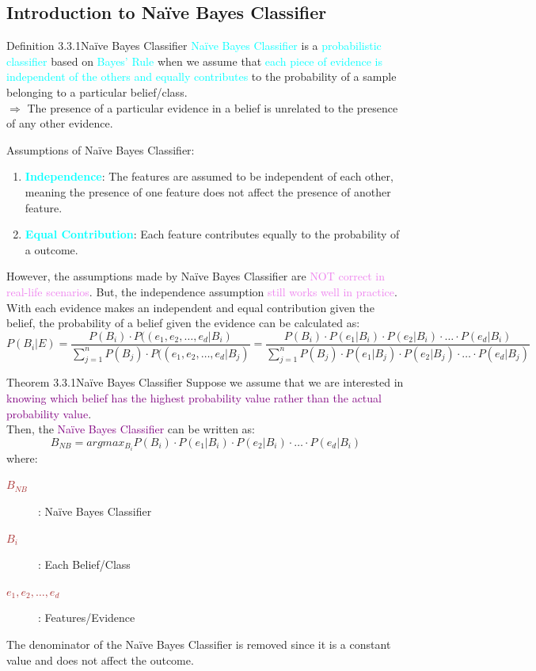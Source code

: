 \documentclass{book}
\begin{document}
\subsection{Introduction to Naïve Bayes Classifier}
\begin{defBox}{Definition 3.3.1}{Naïve Bayes Classifier}
    \textcolor{cyan}{Naïve Bayes Classifier} is a \textcolor{cyan}{probabilistic classifier} based on \textcolor{cyan}{Bayes' Rule} when we assume that \textcolor{cyan}{each piece of evidence is independent of the others and equally contributes} to the probability of a sample belonging to a particular belief/class. \\
    $\Rightarrow$ The presence of a particular evidence in a belief is unrelated to the presence of any other evidence.
\end{defBox}
Assumptions of Naïve Bayes Classifier:
\begin{enumerate}
    \item \textcolor{cyan}{\textbf{Independence}}: The features are assumed to be independent of each other, meaning the presence of one feature does not affect the presence of another feature.
    \item \textcolor{cyan}{\textbf{Equal Contribution}}: Each feature contributes equally to the probability of a outcome.
\end{enumerate}
However, the assumptions made by Naïve Bayes Classifier are \textcolor{violet}{NOT correct in real-life scenarios}. But, the independence assumption \textcolor{violet}{still works well in practice}.\\
\vspace{1mm}
With each evidence makes an independent and equal contribution given the belief, the probability of a belief given the evidence can be calculated as:
\[
    P(B_i|E) = \frac{P(B_i) \cdot P((e_1, e_2, \ldots, e_d|B_i)}{\sum_{j=1}^{n} P(B_j) \cdot P((e_1, e_2, \ldots, e_d|B_j)} = \frac{P(B_i) \cdot P(e_1|B_i) \cdot P(e_2|B_i) \cdot \ldots \cdot P(e_d|B_i)}{\sum_{j=1}^{n} P(B_j) \cdot P(e_1|B_j) \cdot P(e_2|B_j) \cdot \ldots \cdot P(e_d|B_j)}
\]
\begin{thmBox}{Theorem 3.3.1}{Naïve Bayes Classifier}
    Suppose we assume that we are interested in \textcolor{purple}{knowing which belief has the highest probability value rather than the actual probability value}.\\
    Then, the \textcolor{purple}{Naïve Bayes Classifier} can be written as:
    \[
        B_{NB} = argmax_{B_i} P(B_i) \cdot P(e_1|B_i) \cdot P(e_2|B_i) \cdot \ldots \cdot P(e_d|B_i)
    \]
    where:
    \begin{description}
        \item[\textcolor{brown}{\(B_{NB}\)}]: Naïve Bayes Classifier
        \item[\textcolor{brown}{\(B_i\)}]: Each Belief/Class
        \item[\textcolor{brown}{\(e_1, e_2, \ldots, e_d\)}]: Features/Evidence
    \end{description}
    \vspace{1mm}
    The denominator of the Naïve Bayes Classifier is removed since it is a constant value and does not affect the outcome.
\end{thmBox}
\end{document}
